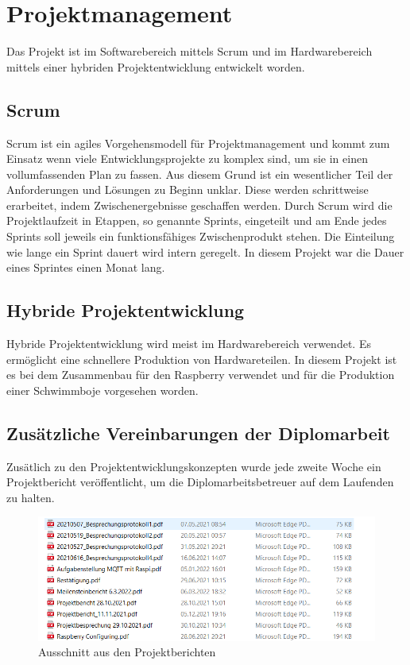 



\section{Projektmanagement}
Das Projekt ist im Softwarebereich mittels Scrum und im Hardwarebereich mittels einer hybriden Projektentwicklung entwickelt worden.

\subsection{Scrum}
Scrum ist ein agiles Vorgehensmodell für Projektmanagement
und kommt zum Einsatz wenn viele Entwicklungsprojekte zu komplex sind, um sie in einen vollumfassenden Plan zu fassen.
Aus diesem Grund ist ein wesentlicher Teil der Anforderungen und Lösungen zu Beginn unklar. 
Diese werden schrittweise erarbeitet, indem Zwischenergebnisse geschaffen werden.
Durch Scrum wird die Projektlaufzeit in Etappen, so genannte Sprints, eingeteilt und
am Ende jedes Sprints soll jeweils ein funktionsfähiges Zwischenprodukt stehen.
Die Einteilung wie lange ein Sprint dauert wird intern geregelt.
In diesem Projekt war die Dauer eines Sprintes einen Monat lang.
\cite{Scrum}

\subsection{Hybride Projektentwicklung}
Hybride Projektentwicklung wird meist im Hardwarebereich verwendet.
Es ermöglicht eine schnellere Produktion von Hardwareteilen.
In diesem Projekt ist es bei dem Zusammenbau für den Raspberry verwendet
und für die Produktion einer Schwimmboje vorgesehen worden.



\subsection{Zusätzliche Vereinbarungen der Diplomarbeit}
Zusätlich zu den Projektentwicklungskonzepten wurde jede zweite Woche ein Projektbericht veröffentlicht, um die Diplomarbeitsbetreuer auf dem Laufenden zu halten.

\begin{figure}[H]
    \centering
    \includegraphics[width=1\textwidth]{pics/AusschnittProjektberichte.png}
    \caption{Ausschnitt aus den Projektberichten}
\end{figure}


